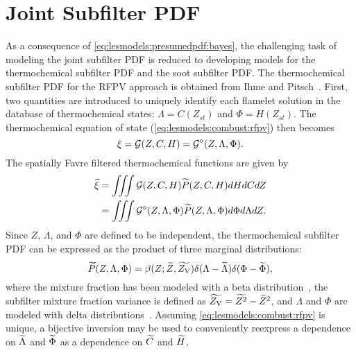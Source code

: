 \section{Joint Subfilter PDF}
\label{sec:subfilter:joint}

As a consequence of \cref{eq:lesmodels:presumedpdf:bayes}, the challenging task of modeling the joint subfilter PDF is reduced to developing models for the thermochemical subfilter PDF and the soot subfilter PDF. The thermochemical subfilter PDF for the RFPV approach is obtained from Ihme and Pitsch~\cite{ihme2008}. First, two quantities are introduced to uniquely identify each flamelet solution in the database of thermochemical states: $\Lambda = C(Z_{st})$ and $\Phi = H(Z_{st})$. The thermochemical equation of state (\cref{eq:lesmodels:combust:rfpv}) then becomes
\begin{equation}\label{eq:lesmodels:presumedpdf:eos}
  \xi = \mathcal{G}(Z, C, H) = \mathcal{G}^{\diamond}(Z, \Lambda, \Phi).
\end{equation}
The spatially Favre filtered thermochemical functions are given by
\begin{equation}\label{eq:lesmodels:presumedpdf:filteredeos}
  \begin{split}
    \widetilde{\xi} &= \iiint \mathcal{G}(Z,C,H)\widetilde{P}(Z,C,H) dHdCdZ \\
    &= \iiint \mathcal{G}^{\diamond}(Z,\Lambda,\Phi)\widetilde{P}(Z,\Lambda,\Phi) d\Phi d\Lambda dZ.
  \end{split}
\end{equation}
Since $Z$, $\Lambda$, and $\Phi$ are defined to be independent, the thermochemical subfilter PDF can be expressed as the product of three marginal distributions:
\begin{equation}\label{eq:lesmodels:presumedpdf:trimarg}
  \widetilde{P}(Z,\Lambda,\Phi) = \beta(Z;\widetilde{Z},\widetilde{Z_{\text{V}}})\delta(\Lambda - \widetilde{\Lambda})\delta(\Phi - \widetilde{\Phi}),
\end{equation}
where the mixture fraction has been modeled with a beta distribution~\cite{cook1994,jimenez1997,wall2000}, the subfilter mixture fraction variance is defined as $\widetilde{Z_{\text{V}}} = \widetilde{Z^2} - \widetilde{Z}^2$, and $\Lambda$ and $\Phi$ are modeled with delta distributions~\cite{ihme2008}. Assuming \cref{eq:lesmodels:combust:rfpv} is unique, a bijective inversion may be used to conveniently reexpress a dependence on $\widetilde{\Lambda}$ and $\widetilde{\Phi}$ as a dependence on $\widetilde{C}$ and $\widetilde{H}$.

